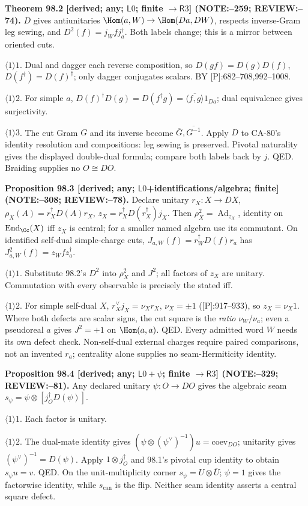 \textbf{Theorem 98.2 [derived; any; \(\mathsf L0\); finite \(\to\mathsf R3\)] (NOTE:--259; REVIEW:--74).}
\(D\) gives antiunitaries \(\Hom(a,W)\to\Hom(Da,DW)\), respects inverse-Gram leg sewing, and
\(D^2(f)=j_Wfj_a^\dagger\). Both labels change; this is a mirror between oriented cuts.
\par\(\langle1\rangle1\). Dual and dagger each reverse composition, so \(D(gf)=D(g)D(f)\),
\(D(f^\dagger)=D(f)^\dagger\); only dagger conjugates scalars. BY [P]:682--708,992--1008.
\par\(\langle1\rangle2\). For simple \(a\),
\(D(f)^\dagger D(g)=D(f^\dagger g)=\overline{\langle f,g\rangle}1_{Da}\); dual equivalence gives surjectivity.
\par\(\langle1\rangle3\). The cut Gram \(G\) and its inverse become \(\overline G,\overline{G^{-1}}\).
Apply \(D\) to CA-80's identity resolution and compositions: leg sewing is preserved. Pivotal naturality gives
the displayed double-dual formula; compare both labels back by \(j\). QED. Braiding supplies no \(O\cong DO\).

\textbf{Proposition 98.3 [derived; any; \(\mathsf L0\)+identifications/algebra; finite] (NOTE:--308; REVIEW:--78).}
Declare unitary \(r_X:X\to DX\), \(\rho_X(A)=r_X^\dagger D(A)r_X\),
\(z_X=r_X^\dagger D(r_X^\dagger)j_X\). Then \(\rho_X^2=\operatorname{Ad}_{z_X}\), identity on
\(\operatorname{End}_\Cc(X)\) iff \(z_X\) is central; for a smaller named algebra use its commutant.
On identified self-dual simple-charge cuts, \(J_{a,W}(f)=r_W^\dagger D(f)r_a\) has
\(J_{a,W}^2(f)=z_Wfz_a^\dagger\).
\par\(\langle1\rangle1\). Substitute 98.2's \(D^2\) into \(\rho_X^2\) and \(J^2\); all factors of \(z_X\)
are unitary. Commutation with every observable is precisely the stated iff.
\par\(\langle1\rangle2\). For simple self-dual \(X\), \(r_X^\vee j_X=\nu_Xr_X\), \(\nu_X=\pm1\)
([P]:917--933), so \(z_X=\nu_X1\). Where both defects are scalar signs, the cut square is the
\emph{ratio} \(\nu_W/\nu_a\); even a pseudoreal \(a\) gives \(J^2=+1\) on \(\Hom(a,a)\). QED.
Every admitted word \(W\) needs its own defect check. Non-self-dual external charges require paired comparisons,
not an invented \(r_a\); centrality alone supplies no seam-Hermiticity identity.

\textbf{Proposition 98.4 [derived; any; \(\mathsf L0+\psi\); finite \(\to\mathsf R3\)] (NOTE:--329; REVIEW:--81).}
Any declared unitary \(\psi:O\to DO\) gives the algebraic seam
\(s_\psi=\psi\otimes[j_O^\dagger D(\psi)]\).
\par\(\langle1\rangle1\). Each factor is unitary.
\par\(\langle1\rangle2\). The dual-mate identity gives
\((\psi\otimes(\psi^\vee)^{-1})u=\mathrm{coev}_{DO}\); unitarity gives \((\psi^\vee)^{-1}=D(\psi)\).
Apply \(1\otimes j_O^\dagger\) and 98.1's pivotal cup identity to obtain \(s_\psi u=v\). QED.
On the unit-multiplicity corner \(s_\psi=U\otimes\overline U\); \(\psi=1\) gives the factorwise identity,
while \(s_{\mathrm{can}}\) is the flip. Neither seam identity asserts a central square defect.

